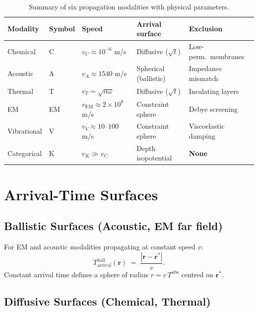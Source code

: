 \begin{table}[!htbp]
\centering
\caption{Summary of six propagation modalities with physical parameters.}
\label{tab:modalities}
\begin{tabular}{lllll}
\toprule
Modality & Symbol & Speed & Arrival surface & Exclusion \\
\midrule
Chemical       & C  & $v_C \approx 10^{-6}$ m/s   & Diffusive ($\sqrt{t}$) & Low-perm.\ membranes \\
Acoustic       & A  & $v_A \approx 1540$ m/s       & Spherical (ballistic)  & Impedance mismatch \\
Thermal        & T  & $v_T = \sqrt{\alpha\omega}$  & Diffusive ($\sqrt{t}$) & Insulating layers \\
EM             & EM & $v_{\mathrm{EM}} \approx 2\!\times\!10^8$ m/s & Constraint sphere & Debye screening \\
Vibrational    & V  & $v_V \approx 10\text{--}100$ m/s  & Constraint sphere  & Viscoelastic damping \\
Categorical    & K  & $v_K \gg v_C$                & Depth isopotential    & \textbf{None} \\
\bottomrule
\end{tabular}
\end{table}

\section{Arrival-Time Surfaces}
\label{sec:arrival-surfaces}

\subsection{Ballistic Surfaces (Acoustic, EM far field)}

For EM and acoustic modalities propagating at constant speed $v$:
\begin{equation}
  T_{\mathrm{arrival}}^{\mathrm{ball}}(\mathbf{r})
  \;=\; \frac{|\mathbf{r} - \mathbf{r}^{*}|}{v}.
  \label{eq:ballistic}
\end{equation}
Constant arrival time defines a sphere of radius $r = v\,T^{\mathrm{obs}}$
centred on $\mathbf{r}^{*}$.

\subsection{Diffusive Surfaces (Chemical, Thermal)}

